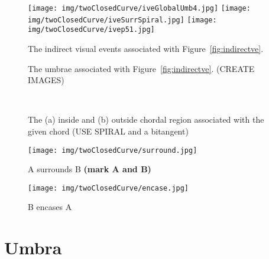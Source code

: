 \documentclass[12pt]{article}
\begin{document}
\begin{figure}[h]
\begin{center}
\texttt{[image: img/twoClosedCurve/iveGlobalUmb4.jpg]}
\texttt{[image: img/twoClosedCurve/iveSurrSpiral.jpg]}
\texttt{[image: img/twoClosedCurve/ivep51.jpg]}
\end{center}
\caption{The indirect visual events associated with Figure~\ref{fig:indirectve}.}
\label{fig:ive}
\end{figure}

\begin{figure}
\begin{center}
\end{center}
\caption{The umbrae associated with Figure~\ref{fig:indirectve}. (CREATE IMAGES)}
\label{fig:indirectumbrae}
\end{figure}

\begin{figure}[h]
\begin{center}
\ 
\end{center}
\caption{The (a) inside and (b) outside chordal region associated with the given chord
         (USE SPIRAL and a bitangent)}
\label{fig:chordalregion}
\end{figure}

\begin{figure}[h]
\begin{center}
\texttt{[image: img/twoClosedCurve/surround.jpg]}
\end{center}
\caption{A surrounds B {\bf (mark A and B)}}
\label{fig:surround}
\end{figure}

\begin{figure}[h]
\begin{center}
\texttt{[image: img/twoClosedCurve/encase.jpg]}
\end{center}
\caption{B encases A}
\label{fig:encase}
\end{figure}

\clearpage


\section{Umbra}
\end{document}
